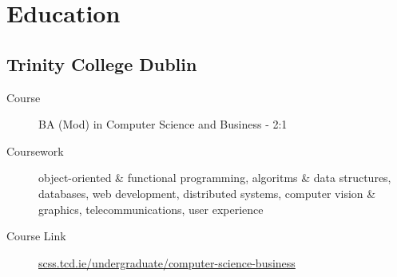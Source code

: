 \section*{Education}

\subsection*{Trinity College Dublin}
\begin{description}
  \item[Course] BA (Mod) in Computer Science and Business - 2:1
  \item[Coursework] object-oriented \& functional programming, algoritms \& data structures, databases, web development, distributed systems, computer vision \& graphics, telecommunications, user experience
  \item[Course Link] \href{https://www.scss.tcd.ie/undergraduate/computer-science-business/}{scss.tcd.ie/undergraduate/computer-science-business}
\end{description}
